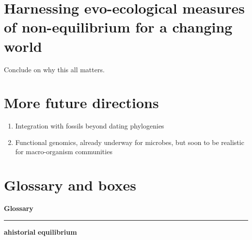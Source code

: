 \documentclass[12pt]{article}
\begin{document}
\section{Harnessing evo-ecological measures of non-equilibrium for a changing world}

Conclude on why this all matters.

\section{More future directions}

\begin{enumerate}
\item Integration with fossils beyond dating phylogenies
\item Functional genomics, already underway for microbes, but soon to
  be realistic for macro-organism communities
\end{enumerate}

\pagebreak

\section*{Glossary and boxes}

\noindent
\colorbox{gray!20}{
  \begin{minipage}{0.97\textwidth}
    \noindent
    {\bf \large Glossary} 
    \vspace{1pt}
    \hrule
    \vspace{1pt}
    
    {\bf ahistorial}
    {\bf equilibrium}
  \end{minipage}
}
\end{document}
